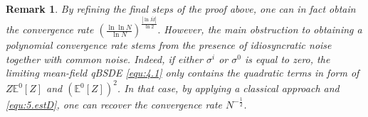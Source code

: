 \documentclass[10pt,a4paper]{article}
\newcommand{\E}{\mathbb{E}}
\theoremstyle{plain}
\newtheorem{Remark}[Theorem]{Remark}
\theoremstyle{definition}
\numberwithin{equation}{section}
\begin{document}
\begin{Remark}\label{rem:logspeed}
By refining the final steps of the proof above, one can in fact obtain the convergence rate
$
(
\frac{\ln \ln N}{\ln N}
)^{
\frac{|\ln \bar{M}|}{\ln 2}
}.
$
However, the main obstruction to obtaining a polynomial convergence rate stems from the presence of idiosyncratic noise together with common noise. Indeed, if either $\sigma^{i}$ or $\sigma^{0}$ is equal to zero, the limiting mean-field qBSDE \eqref{equ:4.1} only contains the quadratic terms in form of \(Z\mathbb{E}^{0}[Z]\) and \((\mathbb{E}^{0}[Z])^{2}\). In that case, by applying a classical approach and \eqref{equ:5.estD}, one can recover the convergence rate $N^{-\tfrac{1}{2}}$.
\end{Remark}
\end{document}
